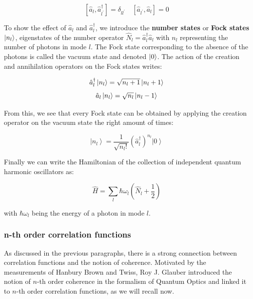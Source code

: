\begin{equation}
    \left[\hat{a}_{l}, \hat{a}_{l^{\prime}}^{\dagger}\right]=\delta_{l l^{\prime}} \quad\left[\hat{a}_{l^{\prime}}, \hat{a}_{l}\right]=0
\end{equation}

To show the effect of $\hat{a}_{l}$ and $\hat{a}_{l}^{\dagger}$, we introduce the \textbf{number states} or \textbf{Fock states} $\ket{n_l}$, eigenstates of the number operator $\hat{N}_l = \hat{a}_{l}^{\dagger} \hat{a}_{l}$ with $n_l$ representing the number of photons in mode $l$. The Fock state corresponding to the absence of the photons is called the vacuum state and denoted $\ket{0}$. The action of the creation and annihilation operators on the Fock states writes:



\begin{equation}
    \hat{a}_{l}^{\dagger} \ket{n_l}=\sqrt{n_l+1}\left|n_l+1\right\rangle
\end{equation}
\begin{equation}
    \hat{a}_{l} \ket{n_l}=\sqrt{n_l}\left|n_l-1\right\rangle
\end{equation}

\noindent From this, we see that every Fock state can be obtained by applying the creation operator on the vacuum state the right amount of times:

\begin{equation}
    \left|n_{l}\right\rangle=\frac{1}{\sqrt{n_{l} !}}\left(\hat{a}_{l}^{\dagger}\right)^{n_{l}}\left|0\right\rangle
\end{equation}


\noindent Finally we can write the Hamiltonian of the collection of independent quantum harmonic oscillators as:

\begin{equation}
    \hat{H}=\sum_{l} \hbar \omega_{l}\left(\hat{N}_{l}+\frac{1}{2}\right)
\end{equation}

\noindent with $\hbar \omega_l$ being the energy of a photon in mode $l$.

\subsubsection{n-th order correlation functions}

As discussed in the previous paragraphs, there is a strong connection between correlation functions and the notion of coherence. Motivated by the measurements of Hanbury Brown and Twiss, Roy J. Glauber introduced \cite{glauber1963quantum} the notion of $n$-th order coherence in the formalism of Quantum Optics and linked it to $n$-th order correlation functions, as we will recall now.

